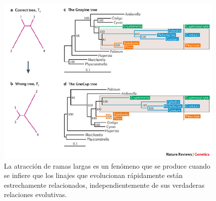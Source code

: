 \begin{figure}[htbp]
\centering
\includegraphics[width=0.5\linewidth]{figs/long-branch-attraction.png}
\caption{La atracción de ramas largas es un fenómeno que se produce cuando se infiere que los linajes que evolucionan rápidamente están estrechamente relacionados, independientemente de sus verdaderas relaciones evolutivas.}
\end{figure}